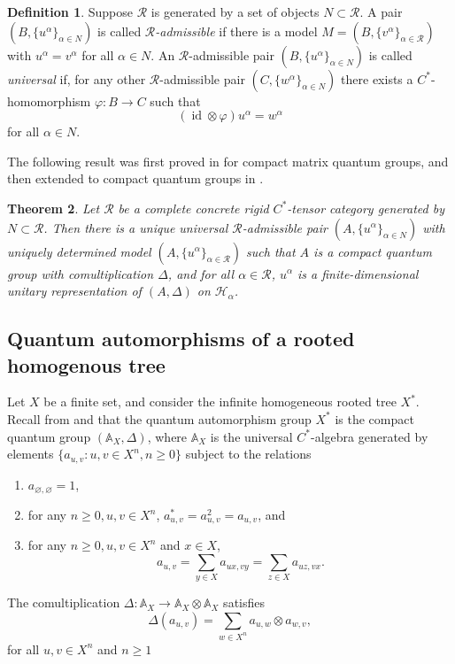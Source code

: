 \documentclass[12pt, a4paper]{amsart}
\def\id{\operatorname{id}}
\def\A{\mathbb{A}}
\def\HH{\mathcal{H}}
\def\RR{\mathcal{R}}
\newtheorem{thm}{Theorem}[section]
\theoremstyle{definition}
\newtheorem{definition}[thm]{Definition}
\theoremstyle{remark}
\numberwithin{equation}{section}
\begin{document}
\begin{definition}
Suppose $\RR$ is generated by a set of objects $N\subset\RR$. A pair $(B,\{u^\alpha\}_{\alpha\in N})$ is called \emph{$\RR$-admissible} if there is a model $M = (B,\{v^\alpha\}_{\alpha\in\RR})$ with $u^\alpha = v^\alpha$ for all $\alpha \in N$. An $\RR$-admissible pair $(B,\{u^\alpha\}_{\alpha\in N})$ is called \emph{universal} if, for any other $\RR$-admissible pair $(C,\{w^\alpha\}_{\alpha\in N})$ there exists a $C^*$-homomorphism $\varphi:B\to C$ such that
\[
 (\id\otimes\varphi)u^\alpha = w^\alpha
\]
for all $\alpha\in N$.
\end{definition}

The following result was first proved in \cite{Wor88} for compact matrix quantum groups, and then extended to compact quantum groups in \cite[A.3. Theorem]{Wang97}. 

\begin{thm}\label{thm:Wang}
Let $\RR$ be a complete concrete rigid $C^*$-tensor category generated by $N\subset \RR$. Then there is a unique universal $\RR$-admissible pair $(A,\{u^\alpha\}_{\alpha\in N})$ with uniquely determined model $(A,\{u^\alpha\}_{\alpha\in \RR})$ such that $A$ is a compact quantum group with comultiplication $\Delta$, and for all $\alpha\in\RR$, $u^\alpha$ is a finite-dimensional unitary representation of $(A,\Delta)$ on $\HH_\alpha$.
\end{thm}

\subsection{Quantum automorphisms of a rooted homogenous tree}
Let $X$ be a finite set, and consider the infinite homogeneous rooted tree $X^*$. Recall from \cite[Definition~3.2]{BR2025} and \cite[Theorem~3.4]{BR2025} that the quantum automorphism group $X^*$ is the compact quantum group $(\A_X,\Delta)$, where  $\mathbb{A}_X$ is the universal $C^*$-algebra generated by elements $\{a_{u,v}: u,v\in X^n, n\geq 0\}$ subject to the relations
	\begin{enumerate}
		\item \label{qaut:identity} $a_{\varnothing,\varnothing} = 1$,
		\item \label{qaut:proj} for any $n\geq 0, u,v\in X^n$, $a_{u,v}^* = a_{u,v}^2 = a_{u,v}$, and
		\item \label{qaut:sum} for any $n\geq 0, u,v\in X^n$ and $x\in X$,
		\[
		a_{u,v} = \sum_{y\in X} a_{ux,vy} = \sum_{z\in X} a_{uz,vx}.
		\]
	\end{enumerate}
The comultiplication $\Delta : \A_X \to \A_X\otimes \A_X$ satisfies
	\[
	\Delta(a_{u,v}) = \sum_{w\in X^n} a_{u,w} \otimes a_{w,v},
	\]
	for all $u,v\in X^n$ and $n\geq 1$
\end{document}

